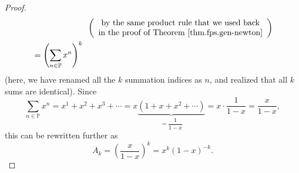\begin{proof}
\begin{align*}
&  \ \ \ \ \ \ \ \ \ \ \ \ \ \ \ \ \ \ \ \ \left(
\begin{array}
[c]{c}%
\text{by the same product rule that we used back}\\
\text{in the proof of Theorem \ref{thm.fps.gen-newton}}%
\end{array}
\right) \\
&  =\left(  \sum_{n\in\mathbb{P}}x^{n}\right)  ^{k}%
\end{align*}
(here, we have renamed all the $k$ summation indices as $n$, and realized that
all $k$ sums are identical). Since%
\[
\sum_{n\in\mathbb{P}}x^{n}=x^{1}+x^{2}+x^{3}+\cdots=x\underbrace{\left(
1+x+x^{2}+\cdots\right)  }_{=\dfrac{1}{1-x}}=x\cdot\dfrac{1}{1-x}=\dfrac
{x}{1-x},
\]
this can be rewritten further as%
\begin{equation}
A_{k}=\left(  \dfrac{x}{1-x}\right)  ^{k}=x^{k}\left(  1-x\right)  ^{-k}.
\label{pf.thm.fps.comps.num-comps-n-k.Ak=}%
\end{equation}



\end{proof}
